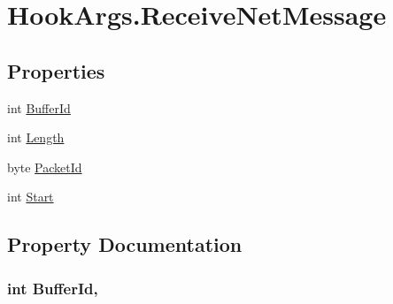 \hypertarget{structOTA_1_1Plugin_1_1HookArgs_1_1ReceiveNetMessage}{}\section{Hook\+Args.\+Receive\+Net\+Message}
\label{structOTA_1_1Plugin_1_1HookArgs_1_1ReceiveNetMessage}
\subsection*{Properties}
\begin{DoxyCompactItemize}
\item 
int \hyperlink{structOTA_1_1Plugin_1_1HookArgs_1_1ReceiveNetMessage_a40875775d70fb4be60823b9834f4ea82}{Buffer\+Id}
\item 
int \hyperlink{structOTA_1_1Plugin_1_1HookArgs_1_1ReceiveNetMessage_a9fde862c8bc443d7a6872a487ec265a3}{Length}
\item 
byte \hyperlink{structOTA_1_1Plugin_1_1HookArgs_1_1ReceiveNetMessage_a124a1326124b63ed7008a151e98c4372}{Packet\+Id}
\item 
int \hyperlink{structOTA_1_1Plugin_1_1HookArgs_1_1ReceiveNetMessage_a0b2c355629c0c41a383ab8db641304ee}{Start}
\end{DoxyCompactItemize}


\subsection{Property Documentation}
\hypertarget{structOTA_1_1Plugin_1_1HookArgs_1_1ReceiveNetMessage_a40875775d70fb4be60823b9834f4ea82}{}
\subsubsection[{Buffer\+Id}]{\setlength{\rightskip}{0pt plus 5cm}int Buffer\+Id\hspace{0.3cm}{\ttfamily [get]}, {\ttfamily [set]}}\label{structOTA_1_1Plugin_1_1HookArgs_1_1ReceiveNetMessage_a40875775d70fb4be60823b9834f4ea82}
\hypertarget{structOTA_1_1Plugin_1_1HookArgs_1_1ReceiveNetMessage_a9fde862c8bc443d7a6872a487ec265a3}{}
